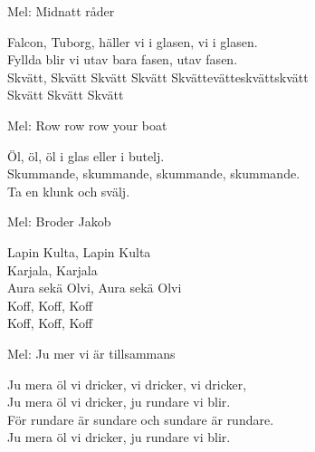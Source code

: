 \begin{SongText}[Diurvisan]
    \begin{SongInfo}
        Mel: Midnatt råder
    \end{SongInfo}
    \begin{SongVerse}
        Falcon, Tuborg, häller vi i glasen, vi i glasen.\\%
        Fyllda blir vi utav bara fasen, utav fasen.\\%
        Skvätt, Skvätt Skvätt Skvätt Skvättevätteskvättskvätt\\%
        Skvätt Skvätt Skvätt
    \end{SongVerse}
\end{SongText}
\begin{SongText}[Öl, öl, öl i glas]
    \begin{SongInfo}
        Mel: Row row row your boat
    \end{SongInfo}
    \begin{SongVerse}
        Öl, öl, öl i glas eller i butelj.\\%
        Skummande, skummande, skummande, skummande.\\%
        Ta en klunk och svälj.
    \end{SongVerse}
\end{SongText}
\begin{SongText}
    \begin{SongInfo}
        Mel: Broder Jakob
    \end{SongInfo}
    \begin{SongVerse}
        Lapin Kulta, Lapin Kulta\\%
        Karjala, Karjala\\%
        Aura sekä Olvi, Aura sekä Olvi\\%
        Koff, Koff, Koff\\%
        Koff, Koff, Koff
    \end{SongVerse}
\end{SongText}
\begin{SongText}
    \begin{SongInfo}
        Mel: Ju mer vi är tillsammans
    \end{SongInfo}
    \begin{SongVerse}
        Ju mera öl vi dricker, vi dricker, vi dricker,\\%
        Ju mera öl vi dricker, ju rundare vi blir.\\%
        För rundare är sundare och sundare är rundare.\\%
        Ju mera öl vi dricker, ju rundare vi blir.
    \end{SongVerse}
\end{SongText}
